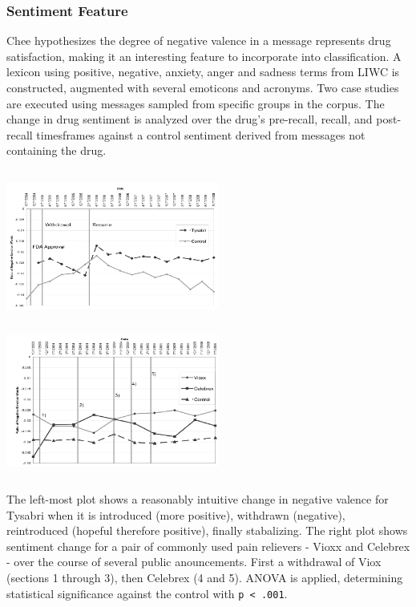 \documentclass[twoside,11pt]{article}
\begin{document}
\subsubsection{Sentiment Feature}
 Chee hypothesizes the degree of negative valence in a message represents drug satisfaction, making it an interesting feature to incorporate into classification. A lexicon using positive, negative, anxiety, anger and sadness terms from LIWC is constructed, augmented with several emoticons and acronyms. Two case studies are executed using messages sampled from specific groups in the corpus. The change in drug sentiment is analyzed over the drug's pre-recall, recall, and post-recall timesframes against a control sentiment derived from messages not containing the drug.

\includegraphics[width=7cm, height=5cm]{Figure-3-Tysabri.png}
\includegraphics[width=7cm, height=5cm]{Figure-4-Vioxx.png}

The left-most plot shows a reasonably intuitive change in negative valence for Tysabri when it is introduced (more positive), withdrawn (negative), reintroduced (hopeful therefore positive), finally stabalizing. The right plot shows sentiment change for a pair of commonly used pain relievers - Vioxx and Celebrex - over the course of several public anouncements. First a withdrawal of Viox (sections 1 through 3), then Celebrex (4 and 5). ANOVA is applied, determining statistical significance against the control with \verb|p < .001|.
\end{document}
